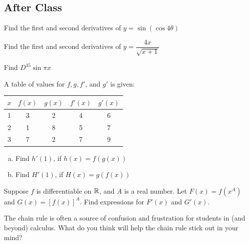 \documentclass[notes]{subfiles}
\begin{document}
	\subsection*{After Class}	
		\begin{ex}
			Find the first and second derivatives of $y = \sin (\cos 4\theta)$
		\end{ex}
		\begin{ex}
			Find the first and second derivatives of $y = \dfrac{4x}{\sqrt{x+1}}$
		\end{ex}
		\begin{ex}
			Find $D^{35} \sin \pi x$
		\end{ex}
			\newpage
			
		\begin{ex}
			A table of values for $f,g,f'$, and $g'$ is given:
			\begin{center}
				\begin{tabular}{|c|c|c|c|c|}\hline
					$x$	& $f(x)$	& $g(x)$	& $f'(x)$	& $g'(x)$ \\ \hline
					1 & 3 & 2 & 4 & 6\\
					2 & 1 & 8 & 5 & 7\\
					3 & 7 & 2 & 7 & 9\\ \hline
				\end{tabular}
			\end{center}
			\begin{enumerate}[(a)]
				\item Find $h'(1)$, if $h(x) = f(g(x))$
					
				\item Find $H'(1)$, if $H(x) = g(f(x))$
			\end{enumerate}
		\end{ex}
		
		\begin{ex}
			Suppose $f$ is differentiable on $\mathbb{R}$, and $A$ is a real number.  Let $F(x) = f(x^A)$ and $G(x) = [f(x)]^A$.  Find expressions for $F'(x)$ and $G'(x)$.
		\end{ex}
			\vs{1}
			
		\begin{ex}
			The chain rule is often a source of confusion and frustration for students in (and beyond) calculus.  What do you think will help the chain rule stick out in your mind?
		\end{ex}
		
	\clearpage
\end{document}
